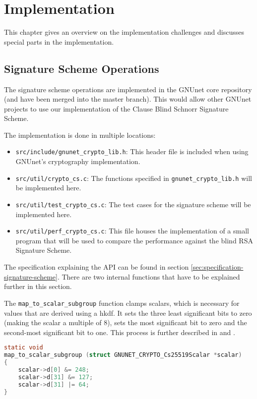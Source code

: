 \chapter{Implementation}
\label{chap:implement}
This chapter gives an overview on the implementation challenges and discusses special parts in the implementation.


\section{Signature Scheme Operations}
The signature scheme operations are implemented in the GNUnet core repository \cite{gnunet-git} (and have been merged into the master branch).
This would allow other GNUnet projects to use our implementation of the Clause Blind Schnorr Signature Scheme.

The implementation is done in multiple locations:
\begin{itemize}
  \item \texttt{src/include/gnunet\_crypto\_lib.h}:
        This header file is included when using GNUnet's cryptography implementation.
  \item \texttt{src/util/crypto\_cs.c}:
        The functions specified in \texttt{gnunet\_crypto\_lib.h} will be implemented here.
  \item \texttt{src/util/test\_crypto\_cs.c}:
        The test cases for the signature scheme will be implemented here.
  \item \texttt{src/util/perf\_crypto\_cs.c}:
        This file houses the implementation of a small program that will be used to compare the performance against the blind RSA Signature Scheme.
\end{itemize}

The specification explaining the \ac{API} can be found in section \ref{sec:specification-signature-scheme}. There are two internal functions that have to be explained further in this section.

The \texttt{map\_to\_scalar\_subgroup} function clamps scalars, which is necessary for values that are derived using a \gls{hkdf}.
It sets the three least significant bits to zero (making the scalar a multiple of 8), sets the most significant bit to zero and the second-most significant bit to one.
This process is further described in \cite{rfc7748} and \cite{madden:curve25519-clamping}.

\begin{lstlisting}[style=bfh-c, language=C, caption={Function map\_to\_scalar\_subgroup - Crypto API}, label={lst:map-to-scalar}]
static void
map_to_scalar_subgroup (struct GNUNET_CRYPTO_Cs25519Scalar *scalar)
{
    scalar->d[0] &= 248;
    scalar->d[31] &= 127;
    scalar->d[31] |= 64;
}
\end{lstlisting}

